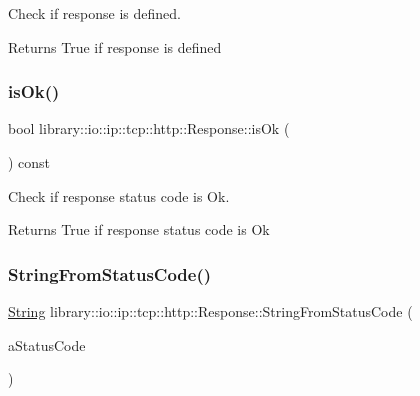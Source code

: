 Check if response is defined. 

\begin{DoxyReturn}{Returns}
True if response is defined 
\end{DoxyReturn}
\mbox{\label{classlibrary_1_1io_1_1ip_1_1tcp_1_1http_1_1_response_a1d09beb5c9b0c9a5a16a106f6b092055}} 
\subsubsection{\texorpdfstring{is\+Ok()}{isOk()}}
{\footnotesize\ttfamily bool library\+::io\+::ip\+::tcp\+::http\+::\+Response\+::is\+Ok (\begin{DoxyParamCaption}{ }\end{DoxyParamCaption}) const}



Check if response status code is Ok. 

\begin{DoxyReturn}{Returns}
True if response status code is Ok 
\end{DoxyReturn}
\mbox{\label{classlibrary_1_1io_1_1ip_1_1tcp_1_1http_1_1_response_a8255fec1c3b634266a963976dd931fca}} 
\subsubsection{\texorpdfstring{String\+From\+Status\+Code()}{StringFromStatusCode()}}
{\footnotesize\ttfamily \hyperlink{namespacelibrary_1_1io_1_1ip_1_1tcp_1_1http_a1c435ea1e3614d52139da88a36632815}{String} library\+::io\+::ip\+::tcp\+::http\+::\+Response\+::\+String\+From\+Status\+Code (\begin{DoxyParamCaption}\item[{const \hyperlink{classlibrary_1_1io_1_1ip_1_1tcp_1_1http_1_1_response_aa6406ad2157079c939b37c94806069f0}{Response\+::\+Status\+Code} \&}]{a\+Status\+Code }\end{DoxyParamCaption})\hspace{0.3cm}{\ttfamily [static]}}



